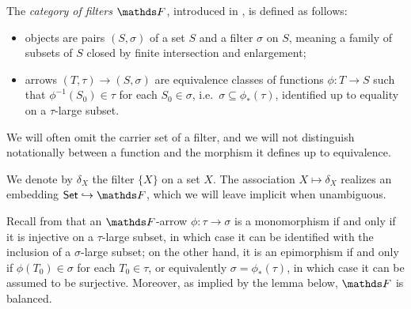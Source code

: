 
\begin{defn}
    The \emph{category of filters} $\FF$, introduced in \cite{koubekCategoryFilters1970}, is defined as follows:
    \begin{itemize}
        \item objects are pairs $(S, \sigma)$ of a set $S$ and a filter $\sigma$ on $S$, meaning a family of subsets of $S$ closed by finite intersection and enlargement;
        \item arrows $(T, \tau) \to (S, \sigma)$ are equivalence classes of functions $\phi \colon T \to S$ such that $\phi^{-1}(S_0) \in \tau $ for each $S_0 \in \sigma$, i.e.\ $\sigma \subseteq \phi_*(\tau)$, identified up to equality on a $\tau$-large subset.
    \end{itemize}
    We will often omit the carrier set of a filter, and we will not distinguish notationally between a function and the morphism it defines up to equivalence.
\end{defn}

We denote by $\delta_X$ the filter $\{X\}$ on a set $X$. The association $X \mapsto \delta_X$ realizes an embedding $\Set \hookrightarrow \FF$, which we will leave implicit when unambiguous.

Recall from \cite[Thm.\ 6]{blassTwoClosedCategories1977} that an $\FF$-arrow $\phi \colon \tau \to \sigma$ is a monomorphism if and only if it is injective on a $\tau$-large subset, in which case it can be identified with the inclusion of a $\sigma$-large subset; on the other hand, it is an epimorphism if and only if $\phi(T_0) \in \sigma$ for each $T_0 \in \tau$, or equivalently $\sigma = \phi_*(\tau)$, in which case it can be assumed to be surjective. Moreover, as implied by the lemma below, $\FF$ is balanced.

